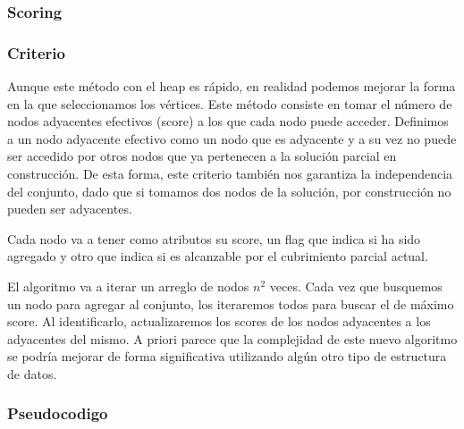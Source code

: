 \subsubsection{Scoring}

\subsubsection*{Criterio}

Aunque este método con el heap es rápido, en realidad podemos mejorar la forma en la que seleccionamos los vértices. Este método consiste en tomar el número de nodos adyacentes efectivos (score) a los que cada nodo puede acceder. Definimos a un nodo adyacente efectivo como un nodo que es adyacente y a su vez no puede ser accedido por otros nodos que ya pertenecen a la solución parcial en construcción. De esta forma, este criterio también nos garantiza la independencia del conjunto, dado que si tomamos dos nodos de la solución, por construcción no pueden ser adyacentes.

Cada nodo va a tener como atributos su score, un flag que indica si ha sido agregado y otro que indica si es alcanzable por el cubrimiento parcial actual.

El algoritmo va a iterar un arreglo de nodos $n^2$ veces. Cada vez que busquemos un nodo para agregar al conjunto, los iteraremos todos para buscar el de máximo score. Al identificarlo, actualizaremos los scores de los nodos adyacentes a los adyacentes del mismo. A priori parece que la complejidad de este nuevo algoritmo se podría mejorar de forma significativa utilizando algún otro tipo de estructura de datos.

\subsubsection*{Pseudocodigo}

\begin{algorithmic}



		\EndIf
		\EndIf
	\EndFor

	  \EndIf
	
	
		\EndFor
	\EndFor
	
\EndFor
\EndProcedure
\end{algorithmic}

